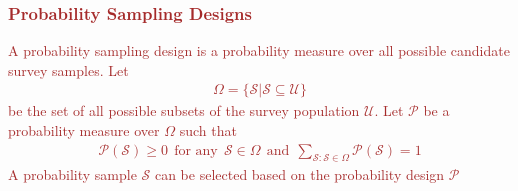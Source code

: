 \documentclass[a4paper,twoside,11pt]{article}
\begin{document}
\textcolor{Brown}{
\subsubsection{Probability Sampling Designs}
A probability sampling design is a probability measure over all possible candidate survey samples. Let
\begin{equation*}
\begin{aligned}
\Omega = \{ \mathcal{S}| \mathcal{S} \subseteq \mathcal{U} \}
\end{aligned}
\end{equation*}
be the set of all possible subsets of the survey population $\mathcal{U}$. Let $\mathcal{P}$ be a probability
measure over $\Omega$ such that
\begin{equation*}
\begin{aligned}
\mathcal{P} (\mathcal{S}) \ge 0 \ \ \text{for any} \ \ \mathcal{S} \in \Omega \ \ \text{and} \ \ \sum_{\mathcal{S:S} \in \Omega} \mathcal{P}(\mathcal{S}) = 1
\end{aligned}
\end{equation*}
A probability sample $\mathcal{S}$ can be selected based on the probability design $\mathcal{P}$ 
}
\end{document}
